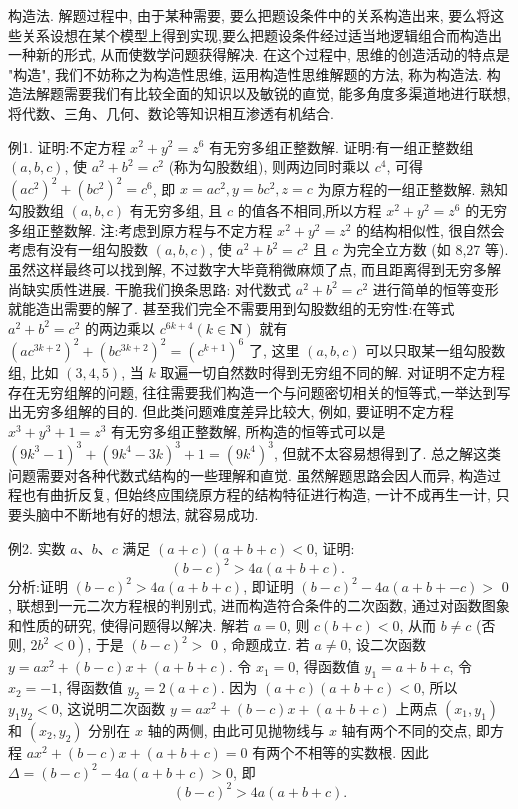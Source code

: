 
构造法.
解题过程中, 由于某种需要, 要么把题设条件中的关系构造出来, 要么将这些关系设想在某个模型上得到实现,要么把题设条件经过适当地逻辑组合而构造出一种新的形式, 从而使数学问题获得解决.
在这个过程中, 思维的创造活动的特点是 "构造", 我们不妨称之为构造性思维, 运用构造性思维解题的方法, 称为构造法.
构造法解题需要我们有比较全面的知识以及敏锐的直觉, 能多角度多渠道地进行联想,将代数、三角、几何、数论等知识相互渗透有机结合.



例1. 证明:不定方程 $x^2+y^2=z^6$ 有无穷多组正整数解.
证明:有一组正整数组 $(a, b, c)$, 使 $a^2+b^2=c^2$ (称为勾股数组), 则两边同时乘以 $c^4$, 可得 $\left(a c^2\right)^2+\left(b c^2\right)^2=c^6$, 即 $x=a c^2, y=b c^2, z=c$ 为原方程的一组正整数解.
熟知勾股数组 $(a, b, c)$ 有无穷多组, 且 $c$ 的值各不相同,所以方程 $x^2+y^2=z^6$ 的无穷多组正整数解.
注:考虑到原方程与不定方程 $x^2+y^2=z^2$ 的结构相似性, 很自然会考虑有没有一组勾股数 $(a, b, c)$, 使 $a^2+b^2=c^2$ 且 $c$ 为完全立方数 (如 8,27 等). 虽然这样最终可以找到解, 不过数字大毕竟稍微麻烦了点, 而且距离得到无穷多解尚缺实质性进展.
干脆我们换条思路: 对代数式 $a^2+b^2=c^2$ 进行简单的恒等变形就能造出需要的解了.
甚至我们完全不需要用到勾股数组的无穷性:在等式 $a^2+b^2=c^2$ 的两边乘以 $c^{6 k+4}(k \in \mathbf{N})$ 就有 $\left(a c^{3 k+2}\right)^2+\left(b c^{3 k+2}\right)^2=\left(c^{k+1}\right)^6$ 了, 这里 $(a, b, c)$ 可以只取某一组勾股数组, 比如 $(3,4,5)$, 当 $k$ 取遍一切自然数时得到无穷组不同的解.
对证明不定方程存在无穷组解的问题, 往往需要我们构造一个与问题密切相关的恒等式,一举达到写出无穷多组解的目的.
但此类问题难度差异比较大, 例如, 要证明不定方程 $x^3+y^3+1=z^3$ 有无穷多组正整数解, 所构造的恒等式可以是 $\left(9 k^3-1\right)^3+\left(9 k^4-3 k\right)^3+1=\left(9 k^4\right)^3$, 但就不太容易想得到了.
总之解这类问题需要对各种代数式结构的一些理解和直觉.
虽然解题思路会因人而异, 构造过程也有曲折反复, 但始终应围绕原方程的结构特征进行构造, 一计不成再生一计, 只要头脑中不断地有好的想法, 就容易成功.



例2. 实数 $a 、 b 、 c$ 满足 $(a+c)(a+b+c)<0$, 证明:
$$
(b-c)^2>4 a(a+b+c) \text {. }
$$
分析:证明 $(b-c)^2>4 a(a+b+c)$, 即证明 $(b-c)^2-4 a(a+b+-c)>$ 0 , 联想到一元二次方程根的判别式, 进而构造符合条件的二次函数, 通过对函数图象和性质的研究, 使得问题得以解决.
解若 $a=0$, 则 $c(b+c)<0$, 从而 $b \neq c$ (否则, $\left.2 b^2<0\right)$, 于是 $(b-c)^2>$ 0 , 命题成立.
若 $a \neq 0$, 设二次函数 $y=a x^2+(b-c) x+(a+b+c)$.
令 $x_1=0$, 得函数值 $y_1=a+b+c$, 令 $x_2=-1$, 得函数值 $y_2=2(a+c)$.
因为 $(a+c)(a+b+c)<0$, 所以 $y_1 y_2<0$, 这说明二次函数 $y=a x^2+ (b-c) x+(a+b+c)$ 上两点 $\left(x_1, y_1\right)$ 和 $\left(x_2, y_2\right)$ 分别在 $x$ 轴的两侧, 由此可见抛物线与 $x$ 轴有两个不同的交点, 即方程 $a x^2+(b-c) x+(a+b+c)=0$ 有两个不相等的实数根.
因此 $\Delta=(b-c)^2-4 a(a+b+c)>0$, 即
$$
(b-c)^2>4 a(a+b+c) .
$$



